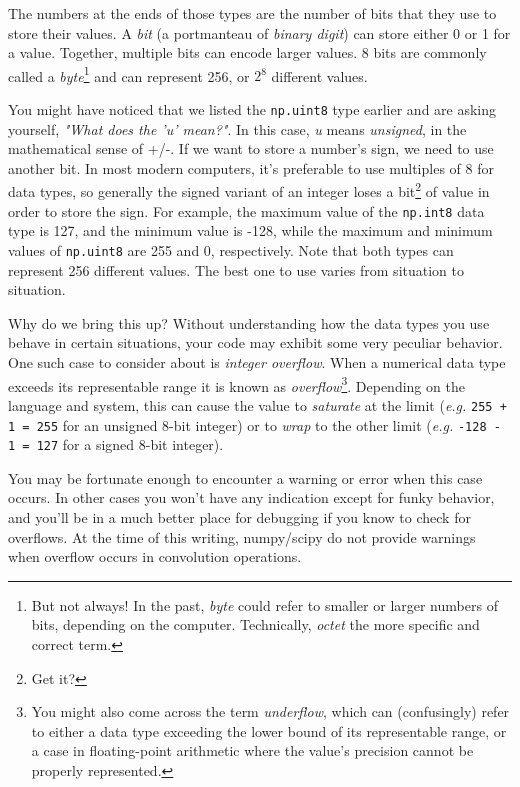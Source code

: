 \documentclass{tufte-handout}
\begin{document}
The numbers at the ends of those types are the number of bits that they use to store their values. A \emph{bit} (a portmanteau of \emph{binary digit}) can store either 0 or 1 for a value. Together, multiple bits can encode larger values. 8 bits are commonly called a \emph{byte}\footnote{But not always! In the past, \emph{byte} could refer to smaller or larger numbers of bits, depending on the computer. Technically, \emph{octet} the more specific and correct term.} and can represent 256, or $2^8$ different values.

You might have noticed that we listed the \lstinline{np.uint8} type earlier and are asking yourself, \emph{"What does the 'u' mean?"}. In this case, \emph{u} means \emph{unsigned}, in the mathematical sense of +/-. If we want to store a number's sign, we need to use another bit. In most modern computers, it's preferable to use multiples of 8 for data types, so generally the signed variant of an integer loses a bit\footnote{Get it?} of value in order to store the sign. For example, the maximum value of the \lstinline{np.int8} data type is 127, and the minimum value is -128, while the maximum and minimum values of \lstinline{np.uint8} are 255 and 0, respectively. Note that both types can represent 256 different values. The best one to use varies from situation to situation.

Why do we bring this up? Without understanding how the data types you use behave in certain situations, your code may exhibit some very peculiar behavior. One such case to consider about is \emph{integer overflow}. When a numerical data type exceeds its representable range it is known as \emph{overflow}\footnote{You might also come across the term \emph{underflow}, which can (confusingly) refer to either a data type exceeding the lower bound of its representable range, or a case in floating-point arithmetic where the value's precision cannot be properly represented.}. Depending on the language and system, this can cause the value to \emph{saturate} at the limit (\emph{e.g.} \lstinline{255 + 1 = 255} for an unsigned 8-bit integer) or to \emph{wrap} to the other limit (\emph{e.g.} \lstinline{-128 - 1 = 127} for a signed 8-bit integer).


You may be fortunate enough to encounter a warning or error when this case occurs. In other cases you won't have any indication except for funky behavior, and you'll be in a much better place for debugging if you know to check for overflows. At the time of this writing, numpy/scipy do not provide warnings when overflow occurs in convolution operations.
\end{document}
